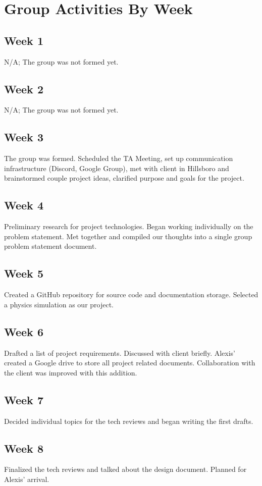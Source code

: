 \documentclass[onecolumn, draftclsnofoot,10pt, compsoc]{IEEEtran}
\begin{document}
\section{Group Activities By Week}
\subsection{Week 1}
N/A; The group was not formed yet.
\subsection{Week 2}
N/A; The group was not formed yet.
\subsection{Week 3}
The group was formed. Scheduled the TA Meeting, set up communication infrastructure (Discord, Google Group), met with client in Hillsboro and brainstormed couple project ideas, clarified purpose and goals for the project.
\subsection{Week 4}
Preliminary research for project technologies. Began working individually on the problem statement. Met together and compiled our thoughts into a single group problem statement document.
\subsection{Week 5}
Created a GitHub repository for source code and documentation storage. Selected a physics simulation as our project.
\subsection{Week 6}
Drafted a list of project requirements. Discussed with client briefly. Alexis' created a Google drive to store all project related documents. Collaboration with the client was improved with this addition.
\subsection{Week 7}
Decided individual topics for the tech reviews and began writing the first drafts.
\subsection{Week 8}
Finalized the tech reviews and talked about the design document. Planned for Alexis' arrival.
\end{document}
